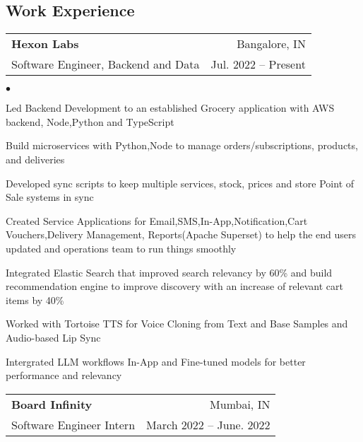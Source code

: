 \documentclass[margin, 11pt]{res}
\makeatletter
\newcommand{\li}{https://linkedin.com/in/harishvadaparty}
\newcommand{\gh}{https://github.com/Harryalways317}
\newcommand{\personalsite}{https://hvadaparty.vercel.app}
\newcommand{\resumeSubheading}[4]{

\begin{tabular*}{1.01\textwidth}{@{\hspace{-4pt}}l @{\extracolsep{\fill}} r}
\textbf{#1} & #2 \\
      {#3} &  {#4}
\end{tabular*}\vspace{-2pt}
}
\newenvironment{list2}{
	\begin{list}{$\bullet$}{%
	    \small
		\setlength{\itemsep}{0in}
		\setlength{\parsep}{0in} \setlength{\parskip}{0in}
		\setlength{\topsep}{0in} \setlength{\partopsep}{0in}
		\setlength{\leftmargin}{0.2in}}}{\end{list}}
\makeatother
\begin{document}
\address{
    \href{https://hvadaparty.vercel.app}{Portfolio} $|$
    \href{mailto:harishvadapartygmail.com}{harishvadaparty@gmail.com} $|$ 
    \href{\li}{linkedin.com/in/harishvadaparty} $|$
    \href{\gh}{github.com/Harryalways317}
}

\begin{resume}

\section{\sc Work Experience}

\vspace{2pt}

\resumeSubheading{{\bf Hexon Labs}}{Bangalore, IN}
                 {Software Engineer, Backend and Data}{Jul. 2022 -- Present}

\begin{list2}
\item{Led Backend Development to an established Grocery application with AWS backend, Node,Python and TypeScript}
\item{Build microservices with Python,Node to  manage orders/subscriptions, products, and deliveries}
\item{Developed sync scripts to keep multiple services, stock, prices and store Point of Sale systems in sync}
\item{Created Service Applications for Email,SMS,In-App,Notification,Cart Vouchers,Delivery Management, Reports(Apache Superset) to help the end users updated and operations team to run things smoothly}
\item{Integrated Elastic Search that improved search relevancy by 60\% and build recommendation engine to improve discovery with an increase of relevant cart items by 40\% }
\item{Worked with Tortoise TTS for Voice Cloning from Text and Base Samples and Audio-based Lip Sync}
\item{Intergrated LLM workflows In-App and Fine-tuned models for better performance and relevancy}
\end{list2}
\resumeSubheading{{\bf Board Infinity}}{Mumbai, IN}
                 {Software Engineer Intern}{March 2022 -- June. 2022}
                 

\end{resume}
\end{document}
